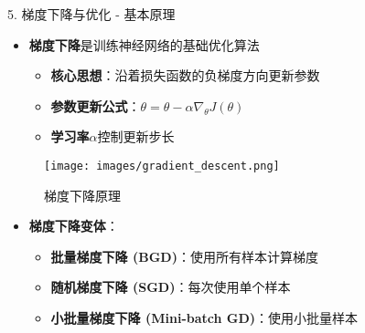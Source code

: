 \documentclass[
  ignorenonframetext,
  aspectratio=169,
  chinese-hans,
]{beamer}
\providecommand{\tightlist}{%
  \setlength{\itemsep}{0pt}\setlength{\parskip}{0pt}}\usepackage{longtable,booktabs,array}
\begin{document}
\begin{frame}{5. 梯度下降与优化 - 基本原理}
\label{ux68afux5ea6ux4e0bux964dux4e0eux4f18ux5316---ux57faux672cux539fux7406}
\begin{itemize}
\tightlist
\item
  \textbf{梯度下降}是训练神经网络的基础优化算法

  \begin{itemize}
  \tightlist
  \item
    \textbf{核心思想}：沿着损失函数的负梯度方向更新参数
  \item
    \textbf{参数更新公式}：\(\theta = \theta - \alpha \nabla_{\theta} J(\theta)\)
  \item
    \textbf{学习率}\(\alpha\)控制更新步长
  \end{itemize}
\end{itemize}

\begin{figure}[H]

{\centering \texttt{[image: images/gradient\_descent.png]}

}

\caption{梯度下降原理}

\end{figure}%

\begin{itemize}
\tightlist
\item
  \textbf{梯度下降变体}：

  \begin{itemize}
  \tightlist
  \item
    \textbf{批量梯度下降 (BGD)}：使用所有样本计算梯度
  \item
    \textbf{随机梯度下降 (SGD)}：每次使用单个样本
  \item
    \textbf{小批量梯度下降 (Mini-batch GD)}：使用小批量样本
  \end{itemize}
\end{itemize}
\end{frame}
\end{document}
